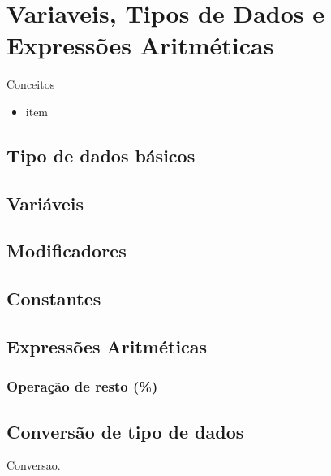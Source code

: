 
\chapter{Variaveis, Tipos de Dados e Expressões Aritméticas}
Conceitos

\begin{itemize}
  \item item
\end{itemize}

\section{Tipo de dados básicos}
\section{Variáveis}
\section{Modificadores}
\section{Constantes}

\section{Expressões Aritméticas}
\subsection{Operação de resto (\%)}

\section{Conversão de tipo de dados}

Conversao.




